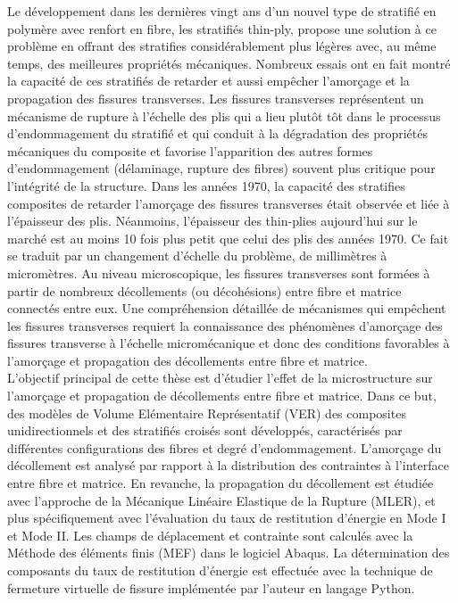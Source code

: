 Le d\'eveloppement dans les derni\`eres vingt ans d'un nouvel type de stratifi\'e en polym\`ere avec renfort en fibre, les stratifi\'es thin-ply, propose une solution \`a ce probl\`eme en offrant des stratifies consid\'erablement plus l\'eg\`eres avec, au m\^eme temps, des meilleures propri\'et\'es m\'ecaniques. Nombreux essais ont en fait montr\'e la capacit\'e de ces stratifi\'es de retarder et aussi emp\^echer l'amor\c{c}age et la propagation des fissures transverses. Les fissures transverses repr\'esentent un m\'ecanisme de rupture \`a l'\'echelle des plis qui a lieu plut\^ot t\^ot dans le processus d'endommagement du stratifi\'e et qui conduit \`a la d\'egradation des propri\'et\'es m\'ecaniques du composite et favorise l'apparition des autres formes d'endommagement (d\'elaminage, rupture des fibres) souvent plus critique pour l'int\'egrit\'e de la structure. Dans les ann\'ees 1970, la capacit\'e des stratifies composites de retarder l'amor\c{c}age des fissures transverses \'etait observ\'ee et li\'ee \`a l'\'epaisseur des plis. N\'eanmoins, l'\'epaisseur des thin-plies aujourd'hui sur le march\'e est au moins 10 fois plus petit que celui des plis des ann\'ees 1970. Ce fait se traduit par un changement d'\'echelle du probl\`eme, de millim\`etres \`a microm\`etres. Au niveau microscopique, les fissures transverses sont form\'ees \`a partir de nombreux d\'ecollements (ou d\'ecoh\'esions) entre fibre et matrice connect\'es entre eux. Une compr\'ehension d\'etaill\'ee de m\'ecanismes qui emp\^echent les fissures transverses requiert la connaissance des ph\'enom\`enes d'amor\c{c}age des fissures transverse \`a l'\'echelle microm\'ecanique et donc des conditions favorables \`a l'amor\c{c}age et propagation des d\'ecollements entre fibre et matrice.\\
L'objectif principal de cette th\`ese est d'\'etudier l'effet de la microstructure sur l'amor\c{c}age et propagation de d\'ecollements entre fibre et matrice. Dans ce but, des mod\`eles de Volume El\'ementaire Repr\'esentatif (VER) des composites unidirectionnels et des stratifi\'es crois\'es sont d\'evelopp\'es, caract\'eris\'es par diff\'erentes configurations des fibres et degr\'e d'endommagement. L'amor\c{c}age du d\'ecollement est analys\'e par rapport \`a la distribution des contraintes \`a l'interface entre fibre et matrice. En revanche, la propagation du d\'ecollement est \'etudi\'ee avec l'approche de la M\'ecanique Lin\'eaire Elastique de la Rupture (MLER), et plus sp\'ecifiquement avec l'\'evaluation du taux de restitution d'\'energie en Mode I et Mode II. Les champs de d\'eplacement et contrainte sont calcul\'es avec la M\'ethode des \'el\'ements finis (MEF) dans le logiciel Abaqus. La d\'etermination des composants du taux de restitution d'\'energie est effectu\'ee avec la technique de fermeture virtuelle de fissure impl\'ement\'ee par l'auteur en langage Python.\\
